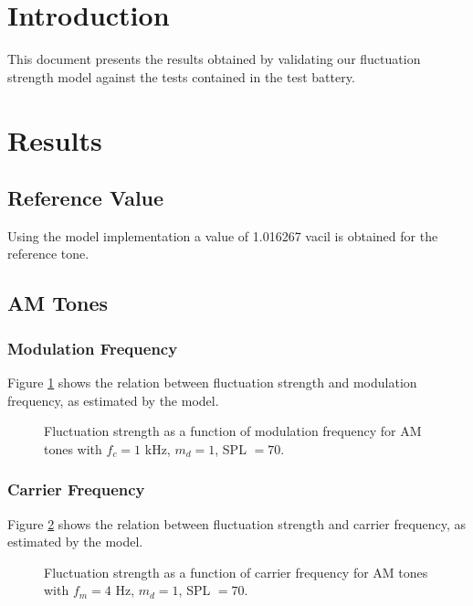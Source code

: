 \documentclass[a4paper]{article}
\begin{document}

\section{Introduction}

This document presents the results obtained by validating our fluctuation
strength model against the tests contained in the test battery.

\section{Results}

\subsection{Reference Value}

Using the model implementation a value of 1.016267 vacil is obtained for the
reference tone.

\subsection{AM Tones}

\subsubsection{Modulation Frequency}

Figure \ref{fig:AMtonesfmplot} shows the relation between fluctuation strength
and modulation frequency, as estimated by the model.

\begin{figure}[ht]
    \centering
    \resizebox{!}{8cm}{
        
    }
    \caption{Fluctuation strength as a function of modulation frequency for AM
        tones with $f_c = 1 $ kHz, $m_d = 1$, SPL $= 70$.}
    \label{fig:AMtonesfmplot}
\end{figure}

\subsubsection{Carrier Frequency}

Figure \ref{fig:AMtonesfcplot} shows the relation between fluctuation strength
and carrier frequency, as estimated by the model.

\begin{figure}[ht]
    \centering
    \resizebox{!}{8cm}{
        
    }
    \caption{Fluctuation strength as a function of carrier frequency for AM
        tones with $f_m = 4 $ Hz, $m_d = 1$, SPL $= 70$.}
    \label{fig:AMtonesfcplot}
\end{figure}
\end{document}
